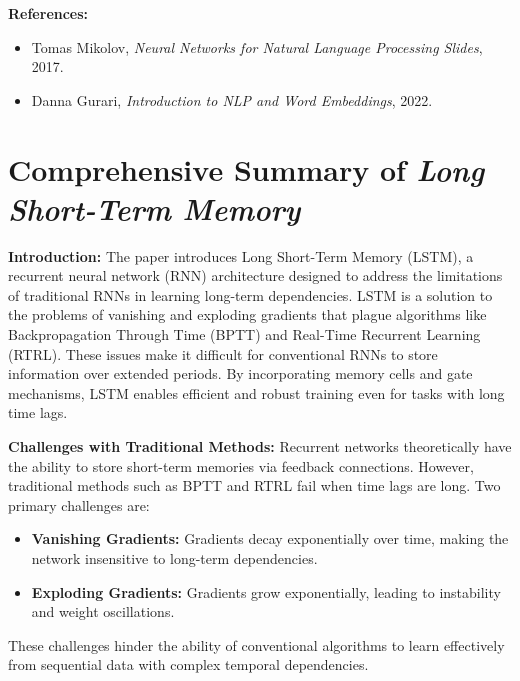 \textbf{References:}
\begin{itemize}
    \item Tomas Mikolov, \textit{Neural Networks for Natural Language Processing Slides}, 2017.
    \item Danna Gurari, \textit{Introduction to NLP and Word Embeddings}, 2022.
\end{itemize}


\section*{Comprehensive Summary of \textit{Long Short-Term Memory}}

\textbf{Introduction:} The paper introduces Long Short-Term Memory (LSTM), a recurrent neural network (RNN) architecture designed to address the limitations of traditional RNNs in learning long-term dependencies. LSTM is a solution to the problems of vanishing and exploding gradients that plague algorithms like Backpropagation Through Time (BPTT) and Real-Time Recurrent Learning (RTRL). These issues make it difficult for conventional RNNs to store information over extended periods. By incorporating memory cells and gate mechanisms, LSTM enables efficient and robust training even for tasks with long time lags.

\textbf{Challenges with Traditional Methods:} Recurrent networks theoretically have the ability to store short-term memories via feedback connections. However, traditional methods such as BPTT and RTRL fail when time lags are long. Two primary challenges are:
\begin{itemize}
    \item \textbf{Vanishing Gradients:} Gradients decay exponentially over time, making the network insensitive to long-term dependencies.
    \item \textbf{Exploding Gradients:} Gradients grow exponentially, leading to instability and weight oscillations.
\end{itemize}
These challenges hinder the ability of conventional algorithms to learn effectively from sequential data with complex temporal dependencies.

